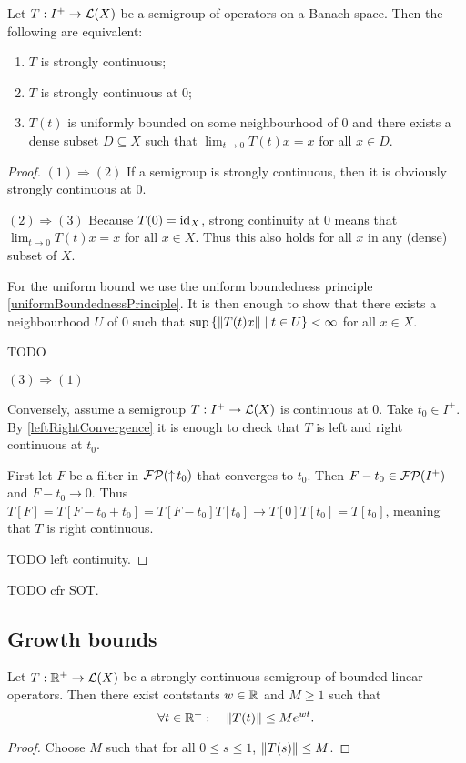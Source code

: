 \begin{proposition}
Let $T:I^+\to \operatorname{\mathcal{L}}(X)$ be a semigroup of operators on a Banach space. Then the following are equivalent:
\begin{enumerate}
\item $T$ is strongly continuous;
\item $T$ is strongly continuous at $0$;
\item $T(t)$ is uniformly bounded on some neighbourhood of $0$ and there exists a dense subset $D\subseteq X$ such that $\lim_{t\to 0} T(t)x = x$ for all $x\in D$.
\end{enumerate}
\end{proposition}
\begin{proof}
$(1) \Rightarrow (2)$ If a semigroup is strongly continuous, then it is obviously strongly continuous at $0$.

$(2) \Rightarrow (3)$ Because $T(0) = \operatorname{id}_X$, strong continuity at $0$ means that $\lim_{t\to 0} T(t)x = x$ for all $x\in X$. Thus this also holds for all $x$ in any (dense) subset of $X$.

For the uniform bound we use the uniform boundedness principle \ref{uniformBoundednessPrinciple}. It is then enough to show that there exists a neighbourhood $U$ of $0$ such that $\sup\left\{ \lVert T(t)x\rVert \;\middle|\; t\in U \right\} <\infty$ for all $x\in X$.

TODO

$(3) \Rightarrow (1)$

Conversely, assume a semigroup $T: I^+\to \operatorname{\mathcal{L}}(X)$ is continuous at $0$. Take $t_0\in I^+$. By \ref{leftRightConvergence} it is enough to check that $T$ is left and right continuous at $t_0$.

First let $F$ be a filter in $\operatorname{\mathcal{FP}}(\operatorname{\uparrow} t_0)$ that converges to $t_0$. Then $F - t_0 \in \operatorname{\mathcal{FP}}(I^+)$ and $F-t_0 \to 0$. Thus $T[F] = T[F-t_0 + t_0] = T[F-t_0]T[t_0] \to T[0]T[t_0] = T[t_0]$, meaning that $T$ is right continuous.

TODO left continuity.
\end{proof}
TODO cfr SOT.

\subsection{Growth bounds}
\begin{proposition}
Let $T: \mathbb{R}^+ \to \operatorname{\mathcal{L}}(X)$ be a strongly continuous semigroup of bounded linear operators. Then there exist contstants $w\in \mathbb{R}$ and $M\geq 1$ such that
\[ \forall t\in\mathbb{R}^+:\quad \lVert T(t)\rVert \leq Me^{wt}. \]
\end{proposition}
\begin{proof}
Choose $M$ such that for all $0\leq s\leq 1$, $\lVert T(s)\rVert\leq M$.
\end{proof}

